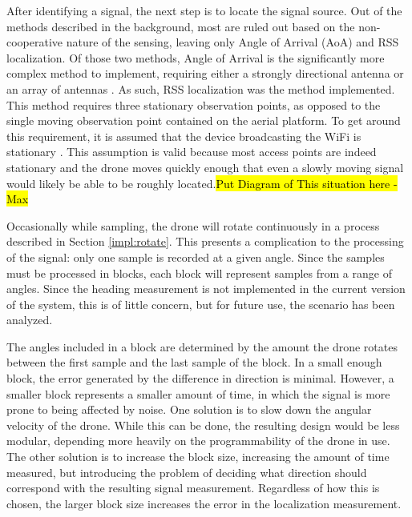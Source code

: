 After identifying a signal, the next step is to locate the signal source. Out of the methods described in the background, most are ruled out based on the non-cooperative nature of the sensing, leaving only Angle of Arrival (AoA) and RSS localization. Of those two methods, Angle of Arrival is the significantly more complex method to implement, requiring either a strongly directional antenna or an array of antennas \cite{local_aoa}. As such, RSS localization was the method implemented. This method requires three stationary observation points, as opposed to the single moving observation point contained on the aerial platform. To get around this requirement, it is assumed that the device broadcasting the WiFi is stationary \cite{rss_calc}. This assumption is valid because most access points are indeed stationary and the drone moves quickly enough that even a slowly moving signal would likely be able to be roughly located.\hl{Put Diagram of This situation here - Max} \par 
Occasionally while sampling, the drone will rotate continuously in a process described in Section \ref{impl:rotate}. This presents a complication to the processing of the signal: only one sample is recorded at a given angle. Since the samples must be processed in blocks, each block will represent samples from a range of angles. Since the heading measurement is not implemented in the current version of the system, this is of little concern, but for future use, the scenario has been analyzed. \par
The angles included in a block are determined by the amount the drone rotates between the first sample and the last sample of the block. In a small enough block, the error generated by the difference in direction is minimal. However, a smaller block represents a smaller amount of time, in which the signal is more prone to being affected by noise. One solution is to slow down the angular velocity of the drone. While this can be done, the resulting design would be less modular, depending more heavily on the programmability of the drone in use. The other solution is to increase the block size, increasing the amount of time measured, but introducing the problem of deciding what direction should correspond with the resulting signal measurement. Regardless of how this is chosen, the larger block size increases the error in the localization measurement.\par 

